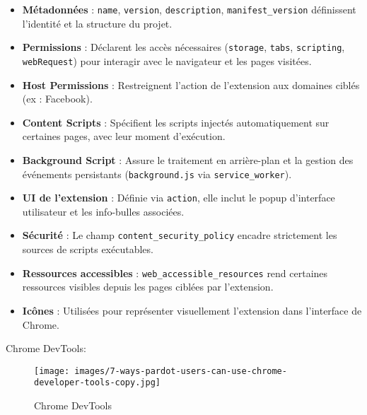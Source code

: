 \begin{itemize}
    \item \textbf{Métadonnées} : \texttt{name}, \texttt{version}, \texttt{description}, \texttt{manifest\_version} définissent l'identité et la structure du projet.
    
    \item \textbf{Permissions} : Déclarent les accès nécessaires (\texttt{storage}, \texttt{tabs}, \texttt{scripting}, \texttt{webRequest}) pour interagir avec le navigateur et les pages visitées.

    \item \textbf{Host Permissions} : Restreignent l'action de l’extension aux domaines ciblés (ex : Facebook).

    \item \textbf{Content Scripts} : Spécifient les scripts injectés automatiquement sur certaines pages, avec leur moment d’exécution.

    \item \textbf{Background Script} : Assure le traitement en arrière-plan et la gestion des événements persistants (\texttt{background.js} via \texttt{service\_worker}).

    \item \textbf{UI de l'extension} : Définie via \texttt{action}, elle inclut le popup d’interface utilisateur et les info-bulles associées.

    \item \textbf{Sécurité} : Le champ \texttt{content\_security\_policy} encadre strictement les sources de scripts exécutables.

    \item \textbf{Ressources accessibles} : \texttt{web\_accessible\_resources} rend certaines ressources visibles depuis les pages ciblées par l’extension.

    \item \textbf{Icônes} : Utilisées pour représenter visuellement l’extension dans l’interface de Chrome.
\end{itemize}

\begin{description}
    \item[Chrome DevTools:]\newline
\end{description}

\begin{figure}[h]
    \centering
    \texttt{[image: images/7-ways-pardot-users-can-use-chrome-developer-tools-copy.jpg]}
    \caption{Chrome DevTools}
    \label{fig:enter-label}
    \end{figure}
    \vspace{-1cm}
